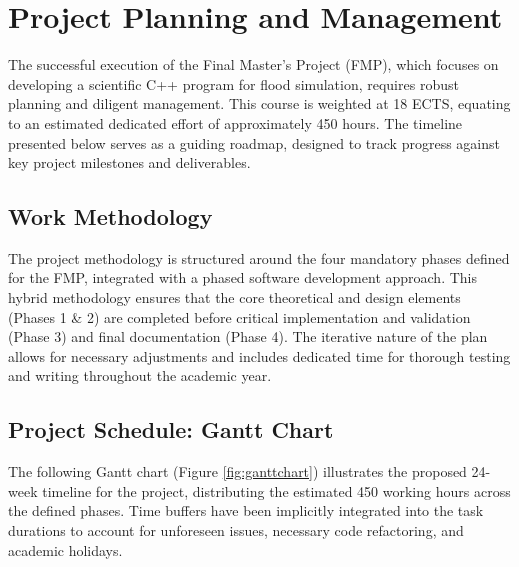 \section{Project Planning and Management}
\label{sec:project_planning_and_management}

The successful execution of the Final Master's Project (FMP), which focuses on developing a scientific C++ program for flood simulation, 
requires robust planning and diligent management. This course is weighted at 18 ECTS, equating to an estimated dedicated effort of 
approximately 450 hours. The timeline presented below serves as a guiding roadmap, designed to track progress against key project 
milestones and deliverables.

\subsection{Work Methodology}
\label{subsec:methodology}

The project methodology is structured around the four mandatory phases defined for the FMP, integrated with a phased software 
development approach. This hybrid methodology ensures that the core theoretical and design elements (Phases 1 \& 2) are completed 
before critical implementation and validation (Phase 3) and final documentation (Phase 4). The iterative nature of the plan allows 
for necessary adjustments and includes dedicated time for thorough testing and writing throughout the academic year.

\subsection{Project Schedule: Gantt Chart}
\label{subsec:gantt}

The following Gantt chart (Figure \ref{fig:ganttchart}) illustrates the proposed 24-week timeline for the project, distributing the 
estimated 450 working hours across the defined phases. Time buffers have been implicitly integrated into the task durations to account 
for unforeseen issues, necessary code refactoring, and academic holidays.


